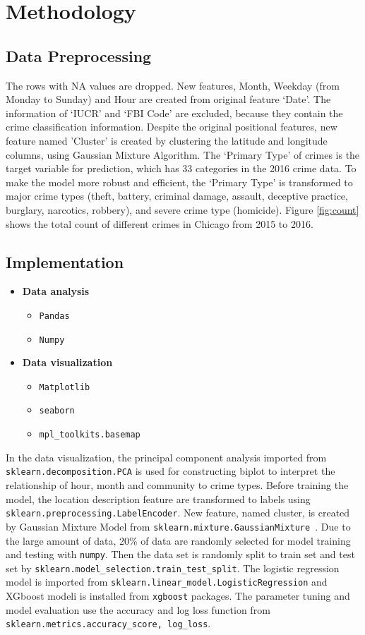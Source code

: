 \documentclass[12pt]{article}
\begin{document}
\section{Methodology}
\subsection{Data Preprocessing}
The rows with NA values are dropped. New features, Month, Weekday (from Monday to Sunday) and Hour are created from original feature ‘Date’. The information of ‘IUCR’ and ‘FBI Code’ are excluded, because they contain the crime classification information. Despite the original positional features, new feature named 'Cluster' is created by clustering the latitude and longitude columns, using Gaussian Mixture Algorithm. 
The ‘Primary Type’ of crimes is the target variable for prediction, which has 33 categories in the 2016 crime data. To make the model more robust and efficient, the ‘Primary Type’ is transformed to major crime types (theft, battery, criminal damage, assault, deceptive practice, burglary, narcotics, robbery), and severe crime type (homicide). Figure \ref{fig:count} shows the total count of different crimes in Chicago from 2015 to 2016.

\subsection{Implementation}
\begin{itemize}
\item{\bf Data analysis} 
	\begin{itemize}
	\item \verb|Pandas|
	\item \verb|Numpy|
	\end{itemize}
\item{\bf Data visualization} 
	\begin{itemize}
	\item \verb|Matplotlib|
	\item \verb|seaborn|
	\item \verb|mpl_toolkits.basemap|
	\end{itemize}
\end{itemize}

In the data visualization, the principal component analysis imported from \verb|sklearn.decomposition.PCA| is used for constructing biplot to interpret the relationship of hour, month and community to crime types. Before training the model, the location description feature are transformed to labels using \verb|sklearn.preprocessing.LabelEncoder|. New feature, named cluster, is created by Gaussian Mixture Model from \verb|sklearn.mixture.GaussianMixture |. Due to the large amount of data, 20\% of data are randomly selected for model training and testing with \verb|numpy|. Then the data set is randomly split to train set and test set by \verb|sklearn.model_selection.train_test_split|. The logistic regression model is imported from \verb|sklearn.linear_model.LogisticRegression| and XGboost modeli is installed from \verb|xgboost| packages. The parameter tuning and model evaluation use the accuracy and log loss function from \verb|sklearn.metrics.accuracy_score, log_loss|.
\end{document}
